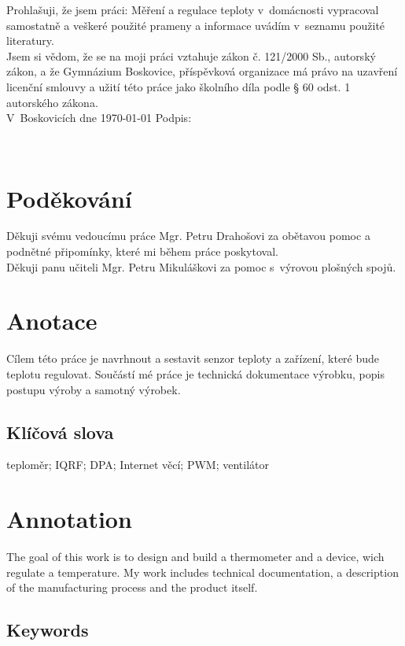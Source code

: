 \documentclass[12pt,a4paper]{article}
\begin{document}
Prohlašuji, že jsem práci: Měření a regulace teploty v~domácnosti vypracoval samostatně a veškeré použité prameny a informace uvádím v~seznamu použité literatury. \\[4mm]
Jsem si vědom, že se na moji práci vztahuje zákon č. 121/2000 Sb., autorský zákon, a že Gymnázium Boskovice, příspěvková organizace má právo na uzavření licenční smlouvy a užití této práce jako školního díla podle § 60 odst. 1 autorského zákona. \\[8mm]
V~Boskovicích dne \today \hspace{24mm} Podpis:

\newpage

~ \vspace{160mm}

\section*{Poděkování}

Děkuji svému vedoucímu práce Mgr. Petru Drahošovi za obětavou pomoc a podnětné připomínky, které mi během práce poskytoval. \\
Děkuji panu učiteli Mgr. Petru Mikuláškovi za pomoc s~výrovou plošných spojů.

\newpage

\section*{Anotace}

Cílem této práce je navrhnout a sestavit senzor teploty a zařízení, které bude teplotu regulovat. Součástí mé práce je technická dokumentace výrobku, popis postupu výroby a samotný výrobek.

\subsection*{Klíčová slova}

teploměr; IQRF; DPA; Internet věcí; PWM; ventilátor


\section*{Annotation}

The goal of this work is to design and build a thermometer and a device, wich regulate a temperature. My work includes technical documentation, a description of the manufacturing process and the product itself.

\subsection*{Keywords}
\end{document}
